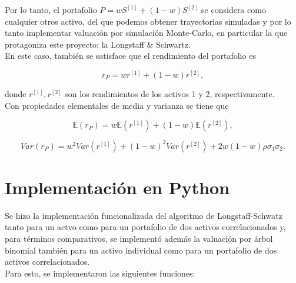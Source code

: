 \documentclass[11pt]{article}
\begin{document}
Por lo tanto, el portafolio $P = wS^{[1]} + (1-w)S^{[2]}$ se considera como cualquier otros activo, del que podemos obtener trayectorias simuladas y por lo tanto implementar valuación por simulación Monte-Carlo, en particular la que protagoniza este proyecto: la Longstaff \& Schwartz.\\

En este caso, también se satisface que el rendimiento del portafolio es

$$r_P = wr^{[1]} + (1-w)r^{[2]},$$

donde $r^{[1]},r^{[2]}$ son los rendimientos de los activos 1 y 2, respectivamente.\\

Con propiedades elementales de media y varianza se tiene que

$$\mathbb{E}(r_P) = w\mathbb{E}(r^{[1]}) + (1-w)\mathbb{E}(r^{[2]}),$$

$$Var(r_P) = w^2Var(r^{[1]}) + (1-w)^2Var(r^{[2]})+2w(1-w)\rho\sigma_1\sigma_2.$$

\section{Implementación en Python}

Se hizo la implementación funcionalizada del algoritmo de Longstaff-Schwatz tanto para un actvo como para un portafolio de dos activos correlacionados y, para términos comparativos, se implementó además la valuación por árbol binomial también para un activo individual como para un portafolio de dos activos correlacionados.\\

Para esto, se implementaron las siguientes funciones:
\end{document}

